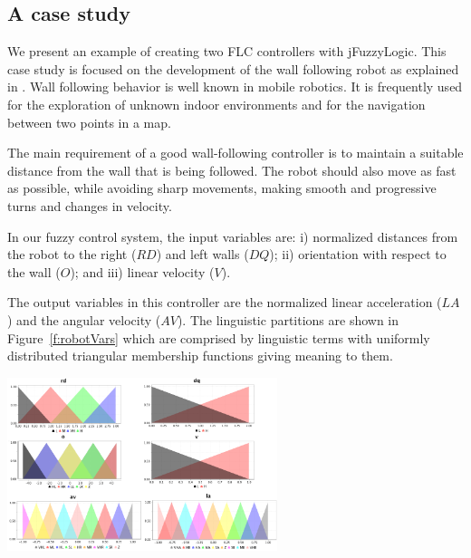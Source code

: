 \documentclass[11pt,twoside]{article}
\begin{document}
\vspace*{10pt}\textlineskip
\begin{multicols}{2}


\section{A case study}
\label{sec:cas}

We present an example of creating two FLC controllers with jFuzzyLogic. This case study is focused on the development of the wall following robot as explained in \cite{Mucientes2010}. Wall following behavior is well known in mobile robotics. It is frequently used for the exploration of unknown indoor environments and for the navigation between two points in a map. 

The main requirement of a good wall-following controller is to maintain a suitable distance from the wall that is being followed. The robot should also move as fast as possible, while avoiding sharp movements, making smooth and progressive turns and changes in velocity.

In our fuzzy control system, the input variables are: 
	i) normalized distances from the robot to the right ($RD$) and left walls ($DQ$); 
	ii) orientation with respect to the wall ($O$); and 
	iii) linear velocity ($V$). 

The output variables in this controller are the normalized linear acceleration ($LA$) and the angular velocity ($AV$). The linguistic partitions are shown in Figure~\ref{f:robotVars} which are comprised by linguistic terms with uniformly distributed triangular membership functions giving meaning to them.

\vspace*{10pt}
\centerline{\includegraphics[width=3.1in]{./figs/robot_vars_2.png}}
\vspace*{10pt}
\label{f:robotVars}
\vspace*{10pt}


\end{multicols}
\end{document}
